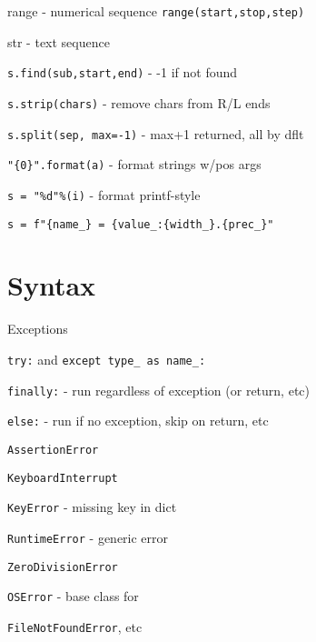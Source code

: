 \documentclass[10pt,a4paper]{article}
\begin{document}
\begin{multicols*}{3}
\noindent range - numerical sequence \verb|range(start,stop,step)|

\noindent str - text sequence

\begin{compactitem}
    \item \verb|s.find(sub,start,end)| - -1 if not found
    \item \verb|s.strip(chars)| - remove chars from R/L ends
    \item \verb|s.split(sep, max=-1)| - max+1 returned, all by dflt
    \item \verb|"{0}".format(a)| - format strings w/pos args
    \item \verb|s = "%d"%(i)| - format printf-style
    \item \verb|s = f"{name_} = {value_:{width_}.{prec_}"|
\end{compactitem}

\section{Syntax}

\noindent Exceptions
\begin{compactitem}
    \item \verb|try:| and \verb|except type_ as name_:|
    \item \verb|finally:| - run regardless of exception (or return, etc)
    \item \verb|else:| - run if no exception, skip on return, etc
\end{compactitem}

\begin{compactitem}
    \item \verb|AssertionError|
    \item \verb|KeyboardInterrupt|
    \item \verb|KeyError| - missing key in dict
    \item \verb|RuntimeError| - generic error
    \item \verb|ZeroDivisionError|
    \item \verb|OSError| - base class for \item \verb|FileNotFoundError|, etc
\end{compactitem}


\end{multicols*}
\end{document}
